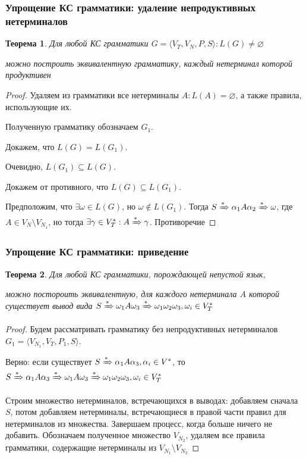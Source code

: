 \documentclass{beamer}
\newtheorem{rutheorem}{Теорема}
\newcommand{\derives}[1][*]{\xRightarrow[]{#1}}
\begin{document}
\begin{frame}[fragile]
  \transwipe[direction=90]
  \frametitle{Упрощение КС грамматики: удаление непродуктивных нетерминалов}

  \begin{rutheorem}
    Для любой КС грамматики $G = \langle V_T, V_N, P, S\rangle: L(G) \neq \varnothing$

    можно построить эквивалентную грамматику, каждый нетерминал которой продуктивен
  \end{rutheorem}

   \begin{proof}
   Удаляем из грамматики все нетерминалы $A: L(A) = \varnothing$, а также правила, использующие их.

   Полученную грамматику обозначаем $G_1$.

   Докажем, что $L(G) = L(G_1)$.

   Очевидно, $L(G_1) \subseteq L(G)$.

   Докажем от противного, что $L(G) \subseteq L(G_1)$.

   Предположим, что $\exists \omega \in L(G)$, но $\omega \notin L(G_1)$.
   Тогда $S \derives \alpha_1 A \alpha_2 \derives \omega$, где $A \in V_N \setminus V_{N_1}$, но тогда $\exists \gamma \in V_T^*: A \derives \gamma $. Противоречие
   \end{proof}
\end{frame}

\begin{frame}[fragile]
  \transwipe[direction=90]
  \frametitle{Упрощение КС грамматики: приведение}

  \begin{rutheorem}
    Для любой КС грамматики, порождающей непустой язык,

    можно постороить эквивалентную, для каждого нетерминала $A$ которой существует вывод вида $S \derives \omega_1 A \omega_3 \derives \omega_1 \omega_2 \omega_3, \omega_i \in V_T^*$
  \end{rutheorem}

   \begin{proof}
   Будем рассматривать грамматику без непродуктивных нетерминалов $G_1 = \langle V_{N_1}, V_T, P_1, S\rangle$.

   Верно: если существует $S \derives \alpha_1 A \alpha_3, \alpha_i \in V^*$, то $S \derives \alpha_1 A \alpha_3 \derives \omega_1 A \omega_3 \derives \omega_1 \omega_2 \omega_3, \omega_i \in V_T^*$

   Строим множество нетерминалов, встречающихся в выводах: добавляем сначала $S$, потом добавляем нетерминалы, встречающиеся в правой части правил для нетерминалов из множества. Завершаем процесс, когда больше ничего не добавить. Обозначаем полученное множество $V_{N_2}$, удаляем все правила грамматики, содержащие нетерминалы из $ V_{N_1} \setminus V_{N_2}$


   \end{proof}
\end{frame}
\end{document}
